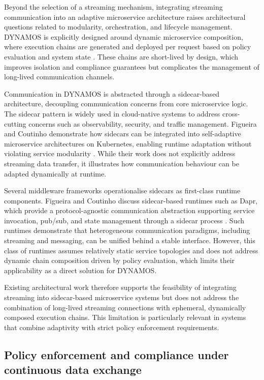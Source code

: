 Beyond the selection of a streaming mechanism, integrating streaming communication into an adaptive microservice architecture raises architectural questions related to modularity, orchestration, and lifecycle management. DYNAMOS is explicitly designed around dynamic microservice composition, where execution chains are generated and deployed per request based on policy evaluation and system state \cite{stutterheim2023thesis,stutterheim2023icsa}. These chains are short-lived by design, which improves isolation and compliance guarantees but complicates the management of long-lived communication channels.

Communication in DYNAMOS is abstracted through a sidecar-based architecture, decoupling communication concerns from core microservice logic. The sidecar pattern is widely used in cloud-native systems to address cross-cutting concerns such as observability, security, and traffic management. Figueira and Coutinho demonstrate how sidecars can be integrated into self-adaptive microservice architectures on Kubernetes, enabling runtime adaptation without violating service modularity \cite{figueira2024selfadaptive}. While their work does not explicitly address streaming data transfer, it illustrates how communication behaviour can be adapted dynamically at runtime.

Several middleware frameworks operationalise sidecars as first-class runtime components. Figueira and Coutinho discuss sidecar-based runtimes such as Dapr, which provide a protocol-agnostic communication abstraction supporting service invocation, pub/sub, and state management through a sidecar process \cite{figueira2024selfadaptive}. Such runtimes demonstrate that heterogeneous communication paradigms, including streaming and messaging, can be unified behind a stable interface. However, this class of runtimes assumes relatively static service topologies and does not address dynamic chain composition driven by policy evaluation, which limits their applicability as a direct solution for DYNAMOS.

Existing architectural work therefore supports the feasibility of integrating streaming into sidecar-based microservice systems but does not address the combination of long-lived streaming connections with ephemeral, dynamically composed execution chains. This limitation is particularly relevant in systems that combine adaptivity with strict policy enforcement requirements.

\subsection{Policy enforcement and compliance under continuous data exchange}


